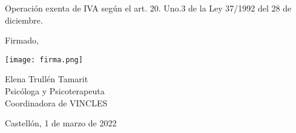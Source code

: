 \documentclass[11pt,a4paper]{article}
\begin{document}
Operación exenta de IVA según el art. 20. Uno.3 de la Ley 37/1992 del 28 de diciembre.

\vspace{0.5cm}

Firmado,

\texttt{[image: firma.png]}

Elena Trullén Tamarit\\
Psicóloga y Psicoterapeuta\\
Coordinadora de VINCLES

\vspace{0.5cm}

\begin{flushright}
	Castellón, 1 de marzo de 2022
\end{flushright}
\end{document}
